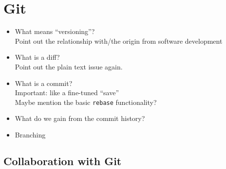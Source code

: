 \documentclass[../../LilyPond-Tutorials]{subfiles}
\begin{document}
\chapter{Git}
\begin{itemize}
\item What means “versioning”?\\
Point out the relationship with/the origin from software development
\item What is a diff?\\
Point out the plain text issue again.
\item What is a commit?\\
Important: like a fine-tuned “save”\\
Maybe mention the basic \texttt{rebase} functionality?
\item What do we gain from the commit history?
\item Branching
\end{itemize}

\section{Collaboration with Git}
\end{document}

